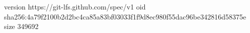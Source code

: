 version https://git-lfs.github.com/spec/v1
oid sha256:4a79f2100b2d2bc4ca85a83bf03033f1f9d8ec980f55dac96be342816d58375e
size 349692
